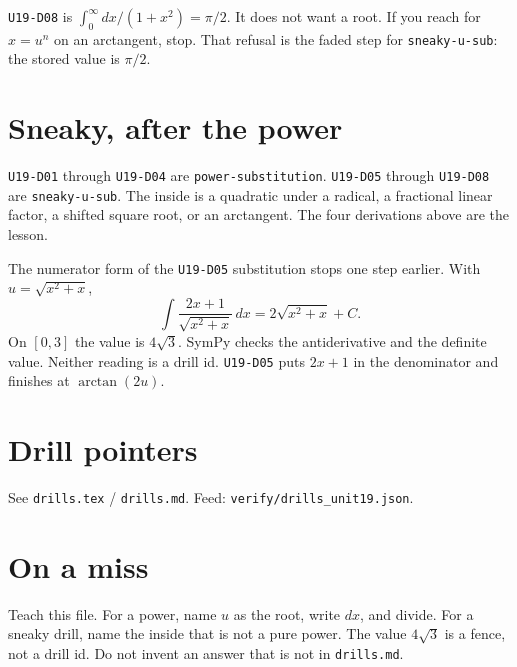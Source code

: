 \texttt{U19-D08} is $\int_0^\infty dx/(1+x^2)=\pi/2$. It does not want a root. If you reach for $x=u^n$ on an arctangent, stop. That refusal is the faded step for \texttt{sneaky-u-sub}: the stored value is $\pi/2$.

\section{Sneaky, after the power}
\texttt{U19-D01} through \texttt{U19-D04} are \texttt{power-substitution}. \texttt{U19-D05} through \texttt{U19-D08} are \texttt{sneaky-u-sub}. The inside is a quadratic under a radical, a fractional linear factor, a shifted square root, or an arctangent. The four derivations above are the lesson.

The numerator form of the \texttt{U19-D05} substitution stops one step earlier. With $u=\sqrt{x^2+x}$,
\[
\int\frac{2x+1}{\sqrt{x^2+x}}\,dx=2\sqrt{x^2+x}+C.
\]
On $[0,3]$ the value is $4\sqrt{3}$. SymPy checks the antiderivative and the definite value. Neither reading is a drill id. \texttt{U19-D05} puts $2x+1$ in the denominator and finishes at $\arctan(2u)$.

\section{Drill pointers}
See \texttt{drills.tex} / \texttt{drills.md}. Feed: \texttt{verify/drills\_unit19.json}.

\section*{On a miss}
Teach this file. For a power, name $u$ as the root, write $dx$, and divide. For a sneaky drill, name the inside that is not a pure power. The value $4\sqrt{3}$ is a fence, not a drill id. Do not invent an answer that is not in \texttt{drills.md}.

